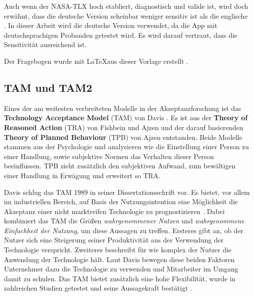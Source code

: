 Auch wenn der NASA-TLX hoch etabliert, diagnostisch und valide ist, wird doch erwähnt, dass die deutsche Version scheinbar weniger sensitiv ist als die englische \cite{horold_faktor_2015}. In dieser Arbeit wird die deutsche Version verwendet, da die App mit deutschsprachigen Probanden getestet wird. Es wird darauf vertraut, dass die Sensitivität ausreichend ist. 

Der Fragebogen wurde mit \LaTeX  aus dieser Vorlage erstellt \cite{doi_org}.

\subsection{TAM und TAM2}

Eines der am weitesten verbreiteten Modelle in der Akzeptanzforschung ist das \textbf{Technology Acceptance Model} (TAM) von Davis \cite{davis_perceived_1989}. Es ist aus der \textbf{Theory of Reasoned Action} (TRA) von Fishbein und Ajzen \cite{fishbein_belief_1975} und der darauf basierenden \textbf{Theory of Planned Behaviour} (TPB) von Ajzen \cite{ajzen_theory_1991} entstanden. Beide Modelle stammen aus der Psychologie und analysieren wie die Einstellung einer Person zu einer Handlung, sowie subjektive Normen das Verhalten dieser Person beeinflussen. TPB zieht zusätzlich den subjektiven Aufwand, zum bewältigen einer Handlung in Erwägung und erweitert so TRA. 

Davis schlug das TAM 1989 in seiner Dissertationsschrift vor. Es bietet, vor allem im industriellen Bereich, auf Basis der Nutzungsintention eine Möglichkeit die Akzeptanz einer nicht marktreifen Technologie zu prognostizieren \cite{wilhelm_nutzerakzeptanz_nodate}. Dabei kombiniert das TAM die Größen \textit{wahrgenommener Nutzen} und \textit{wahrgenommene Einfachheit der Nutzung}, um diese Aussagen zu treffen. Ersteres gibt an, ob der Nutzer sich eine Steigerung seiner Produktivität aus der Verwendung der Technologie verspricht. Zweiteres beschreibt für wie komplex der Nutzer die Anwendung der Technologie hält. Laut Davis bewegen diese beiden Faktoren Unternehmer dazu die Technologie zu verwenden und Mitarbeiter im Umgang damit zu schulen. Das TAM bietet zusätzlich eine hohe Flexibilität, wurde in zahlreichen Studien getestet und seine Aussagekraft bestätigt \cite{university_of_arkansas_dead_2007}.

